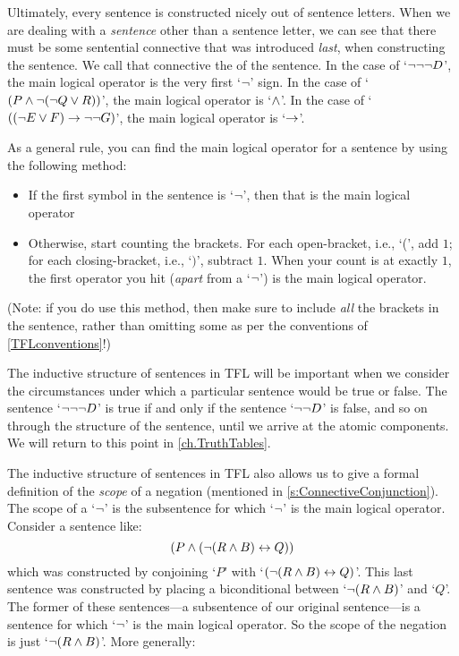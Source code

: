 Ultimately, every sentence is constructed nicely out of sentence letters. When we are dealing with a \emph{sentence} other than a sentence letter, we can see that there must be some sentential connective that was introduced \emph{last}, when constructing the sentence. We call that connective the  of the sentence. In the case of `$\neg\neg\neg D$', the main logical operator is the very first `$\neg$' sign. In the case of `$(P \wedge \neg (\neg Q \vee R))$', the main logical operator is `$\wedge$'. In the case of `$((\neg E \vee F) \rightarrow \neg\neg G)$', the main logical operator is `$\rightarrow$'.

As a general rule, you can find the main logical operator for a sentence by using the following method:
\begin{itemize}
	\item If the first symbol in the sentence is `$\neg$', then that is the main logical operator
	\item Otherwise, start counting the brackets. For each open-bracket, i.e., `(', add $1$; for each closing-bracket, i.e., `$)$', subtract $1$. When your count is at exactly $1$, the first operator you hit (\emph{apart} from a `$\neg$') is the main logical operator.
\end{itemize}

(Note: if you do use this method, then make sure to include \emph{all} the brackets in the sentence, rather than omitting some as per the conventions of \cref{TFLconventions}!)

The inductive structure of sentences in TFL will be important when we consider the circumstances under which a particular sentence would be true or false. The sentence `$\neg \neg \neg D$' is true if and only if the sentence `$\neg \neg D$' is false, and so on through the structure of the sentence, until we arrive at the atomic components. We will return to this point in \cref{ch.TruthTables}.

The inductive structure of sentences in TFL also allows us to give a formal definition of the \emph{scope} of a negation (mentioned in \cref{s:ConnectiveConjunction}). The scope of a `$\neg$' is the subsentence for which `$\neg$' is the main logical operator. Consider a sentence like:
$$(P \wedge (\neg (R \wedge B) \leftrightarrow Q))$$
which was constructed by conjoining `$P$' with `$ (\neg (R \wedge B) \leftrightarrow Q)$'. This last sentence was constructed by placing a biconditional between `$\neg (R \wedge B)$' and `$Q$'. The former of these sentences---a subsentence of our original sentence---is a sentence for which `$\neg$' is the main logical operator. So the scope of the negation is just `$\neg(R \wedge B)$'. More generally:


